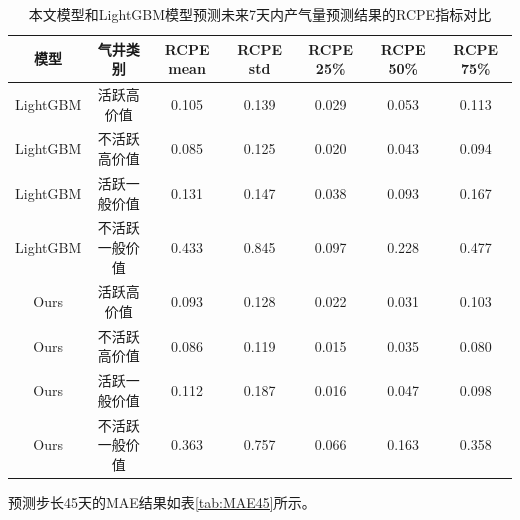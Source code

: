 \begin{table}[H]
    \renewcommand{\arraystretch}{1.5}
    \centering
    \caption{本文模型和LightGBM模型预测未来7天内产气量预测结果的RCPE指标对比}
    \label{tab:RCPE7}
    \begin{tabular}{|c|c|c|c|c|c|c|} %
    \hline
    模型     & 气井类别 & RCPE mean & RCPE std & RCPE 25\% & RCPE 50\% & RCPE 75\% \\ \hline
    LightGBM & 活跃高价值        &0.105     & 0.139     &0.029      &0.053       &0.113 \\ \hline
    LightGBM & 不活跃高价值      & 0.085     & 0.125    & 0.020     & 0.043     & 0.094     \\ \hline
    LightGBM & 活跃一般价值     & 0.131     & 0.147    & 0.038     & 0.093     & 0.167     \\ \hline
    LightGBM & 不活跃一般价值      & 0.433     & 0.845    & 0.097     & 0.228     & 0.477     \\ \hline
    Ours      &活跃高价值         &0.093     & 0.128     &0.022      & 0.031      &0.103 \\ \hline
    Ours      & 不活跃高价值      & 0.086     & 0.119    & 0.015     & 0.035     & 0.080     \\ \hline
    Ours      & 活跃一般价值     & 0.112     & 0.187    & 0.016     & 0.047     & 0.098     \\ \hline
    Ours      & 不活跃一般价值      & 0.363     & 0.757    & 0.066     & 0.163     & 0.358     \\ \hline
    \end{tabular}
\end{table}
预测步长45天的MAE结果如表\ref{tab:MAE45}所示。
